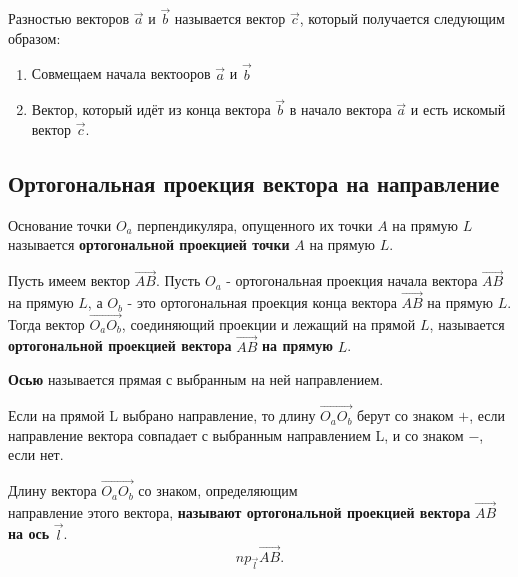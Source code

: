 \begin{definition}
  Разностью векторов $\vec{a}$ и $\vec{b}$ называется вектор $\vec{c}$, который получается следующим образом:
  \begin{enumerate}
    \item Совмещаем начала вектооров $\vec{a}$ и $\vec{b}$
    \item Вектор, который идёт из конца вектора $\vec{b}$ в начало вектора $\vec{a}$ и есть искомый вектор $\vec{c}$. 
  \end{enumerate}
\end{definition}

\subsection{Ортогональная проекция вектора на направление}

\begin{definition}
  Основание точки $O_a$ перпендикуляра, опущенного их точки $A$ на прямую $L$ называется \textbf{ортогональной проекцией точки} $A$ на прямую $L$.
\end{definition}

\begin{definition}
  Пусть имеем вектор $\overrightarrow{AB}$. Пусть $O_a$ - ортогональная проекция начала вектора $\overrightarrow{AB}$ на прямую $L$, а $O_b$ - это ортогональная проекция конца вектора $\overrightarrow{AB}$ на прямую $L$. Тогда вектор $\overrightarrow{O_aO_b}$, соединяющий проекции и лежащий на прямой $L$, называется \textbf{ортогональной проекцией вектора} $\overrightarrow{AB}$ \textbf{на прямую} $L$.
\end{definition}

\begin{definition}
  \textbf{Осью} называется прямая с выбранным на ней направлением.
\end{definition}

Если на прямой L выбрано направление, то длину $\overrightarrow{O_aO_b}$ берут со знаком $+$, если направление вектора совпадает с выбранным направлением L, и со знаком  $-$, если нет.

\begin{definition}
  Длину вектора $\overrightarrow{O_aO_b}$ со знаком, определяющим \\ направление этого вектора, \textbf{называют ортогональной проекцией вектора} $\overrightarrow{AB}$ \textbf{на ось} $\vec{l}$.
  \[
    np_{\vec{l}}\overrightarrow{AB}
  .\] 
\end{definition}

